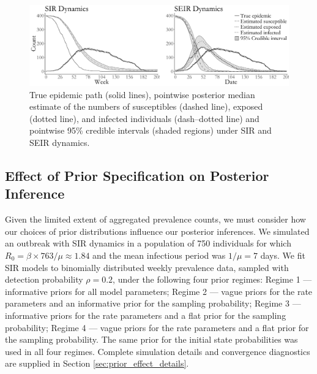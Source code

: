 \begin{figure}[!h]
	\centering
	\includegraphics[width=0.9\linewidth]{figures/misspec_latent_posts.pdf}
	\caption[Latent posterior distributions for SIR and SEIR models fit to simulated data from an SEIR model with time--varying dynamics.]{True epidemic path (solid lines), pointwise posterior median estimate of the numbers of susceptibles (dashed line), exposed (dotted line), and infected individuals (dash--dotted line) and pointwise 95\% credible intervals (shaded regions) under SIR and SEIR dynamics.}
	\label{fig:misspec_latent_posts}
\end{figure}

\subsection{Effect of Prior Specification on Posterior Inference}
\label{subsec:prior_effect_sim}
Given the limited extent of aggregated prevalence counts, we must consider how our choices of prior distributions influence our posterior inferences. We simulated an outbreak with SIR dynamics in a population of 750 individuals for which $ R_0 = \beta \times 763 / \mu \approx 1.84 $ and the mean infectious period was $ 1/\mu = 7 $ days. We fit SIR models to binomially distributed weekly prevalence data, sampled with detection probability $ \rho = 0.2$, under the following four prior regimes: Regime 1 --- informative priors for all model parameters; Regime 2 --- vague priors for the rate parameters and an informative prior for the sampling probability; Regime 3 --- informative priors for the rate parameters and a flat prior for the sampling probability; Regime 4 --- vague priors for the rate parameters and a flat prior for the sampling probability. The same prior for the initial state probabilities was used in all four regimes. Complete simulation details and convergence diagnostics are supplied in Section \ref{sec:prior_effect_details}.

